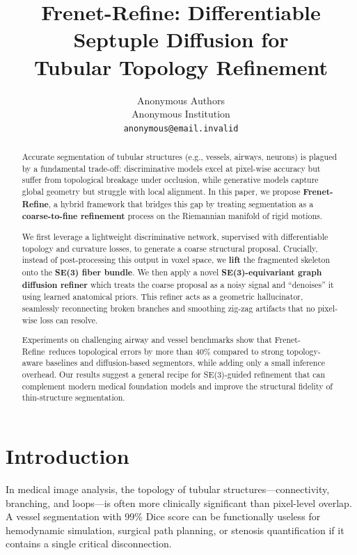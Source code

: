 \documentclass{article}
\title{Frenet-Refine: Differentiable Septuple Diffusion for \\ Tubular Topology Refinement}
\author{%
  Anonymous Authors \\
  Anonymous Institution \\
  \texttt{anonymous@email.invalid} \\
}
\date{}
\newcommand{\modelname}{Frenet-Refine}
\begin{document}
\maketitle

\begin{abstract}
Accurate segmentation of tubular structures (e.g., vessels, airways, neurons) is plagued by a fundamental trade-off: discriminative models excel at pixel-wise accuracy but suffer from topological breakage under occlusion, while generative models capture global geometry but struggle with local alignment. In this paper, we propose \textbf{\modelname}, a hybrid framework that bridges this gap by treating segmentation as a \textbf{coarse-to-fine refinement} process on the Riemannian manifold of rigid motions.

We first leverage a lightweight discriminative network, supervised with differentiable topology and curvature losses, to generate a coarse structural proposal. Crucially, instead of post-processing this output in voxel space, we \textbf{lift} the fragmented skeleton onto the \textbf{SE(3) fiber bundle}. We then apply a novel \textbf{SE(3)-equivariant graph diffusion refiner} which treats the coarse proposal as a noisy signal and ``denoises'' it using learned anatomical priors. This refiner acts as a geometric hallucinator, seamlessly reconnecting broken branches and smoothing zig-zag artifacts that no pixel-wise loss can resolve.

Experiments on challenging airway and vessel benchmarks show that \modelname\ reduces topological errors by more than 40\% compared to strong topology-aware baselines and diffusion-based segmentors, while adding only a small inference overhead. Our results suggest a general recipe for SE(3)-guided refinement that can complement modern medical foundation models and improve the structural fidelity of thin-structure segmentation.
\end{abstract}

\section{Introduction}

In medical image analysis, the topology of tubular structures---connectivity, branching, and loops---is often more clinically significant than pixel-level overlap. A vessel segmentation with 99\% Dice score can be functionally useless for hemodynamic simulation, surgical path planning, or stenosis quantification if it contains a single critical disconnection.
\end{document}
